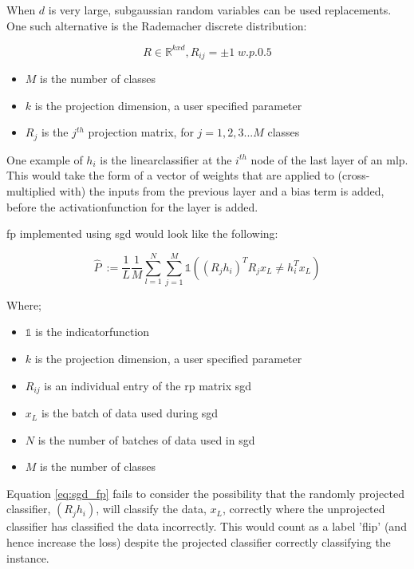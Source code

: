 When $d$ is very large, subgaussian random variables can be used replacements. One such alternative is the Rademacher discrete distribution:

\begin{equation}
R \in \mathds{R}^{kxd}, R_{ij} = \pm 1 \; w.p. 0.5 
\end{equation}

\begin{itemize}
\itemsep-1em 
\item $M$ is the number of classes  
\item $k$ is the projection dimension, a user specified parameter 
\item $R_{j}$ is the $j^{th}$ projection matrix, for $j = 1,2,3 ... M$ classes 
\end{itemize}

One example of $h_i$ is the \gls{linearclassifier} at the $i^{th}$ node of the last layer of an \gls{mlp}. This would take the form of a vector of weights that are applied to (cross-multiplied with) the inputs from the previous layer and a bias term is added, before the \gls{activationfunction} for the layer is added.
\bigskip

\bigskip

\gls{fp} implemented using  \gls{sgd} would look like the following:

\begin{equation}
\hat{P}\ := \frac{1}{L}\frac{1}{M}\sum_{l = 1}^N \sum_{j = 1}^M \mathds{1}((R_j h_i)^T R_jx_L \neq h_i^Tx_L)  
\label{eq:sgd_fp}
\end{equation}

Where;  \smallskip

\begin{itemize}
\itemsep-1em 
\item $\mathds{1}$ is the \gls{indicatorfunction}  
\item $k$ is the projection dimension, a user specified parameter 
\item $R_{ij}$ is an individual entry of the \gls{rp} matrix  \gls{sgd} 
\item $x_L$ is the batch of data used during  \gls{sgd}  
\item $N$ is the number of batches of data used in  \gls{sgd}  
\item $M$ is the number of classes %
\end{itemize}

Equation \ref{eq:sgd_fp} fails to consider the possibility that the randomly projected classifier,  $(R_j h_i)$, will classify the data, $x_L$, correctly where the unprojected classifier has classified the data incorrectly. This would count as a label 'flip' (and hence increase the \gls{loss}) despite the projected classifier correctly classifying the instance.
\bigskip


